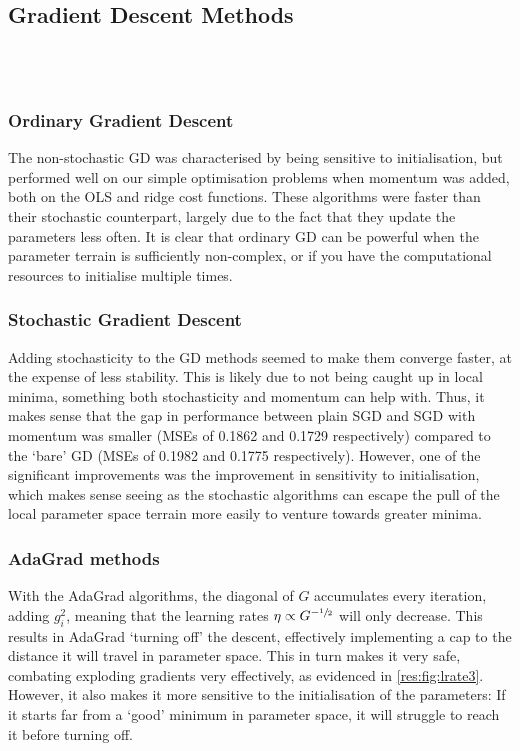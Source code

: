 \\

\subsection{Gradient Descent Methods}
    \\
    \\

    \subsubsection{Ordinary Gradient Descent}
        The non-stochastic GD was characterised by being sensitive to initialisation, but performed well on our simple optimisation problems when momentum was added, both on the OLS and ridge cost functions. These algorithms were faster than their stochastic counterpart, largely due to the fact that they update the parameters less often. It is clear that ordinary GD can be powerful when the parameter terrain is sufficiently non-complex, or if you have the computational resources to initialise multiple times. 

    \subsubsection{Stochastic Gradient Descent}
        Adding stochasticity to the GD methods seemed to make them converge faster, at the expense of less stability. This is likely due to not being caught up in local minima, something both stochasticity and momentum can help with. Thus, it makes sense that the gap in performance between plain SGD and SGD with momentum was smaller (MSEs of 0.1862 and 0.1729 respectively) compared to the `bare' GD (MSEs of 0.1982 and 0.1775 respectively). However, one of the significant improvements was the improvement in sensitivity to initialisation, which makes sense seeing as the stochastic algorithms can escape the pull of the local parameter space terrain more easily to venture towards greater minima.

    \subsubsection{AdaGrad methods}
        With the AdaGrad algorithms, the diagonal of $G$ accumulates every iteration, adding $g_i^2$, meaning that the learning rates $\eta \propto G^{-\sfrac{1}{2}}$ will only decrease. This results in AdaGrad `turning off' the descent, effectively implementing a cap to the distance it will travel in parameter space. This in turn makes it very safe, combating exploding gradients very effectively, as evidenced in \cref{res:fig:lrate3}. However, it also makes it more sensitive to the initialisation of the parameters: If it starts far from a `good' minimum in parameter space, it will struggle to reach it before turning off.

